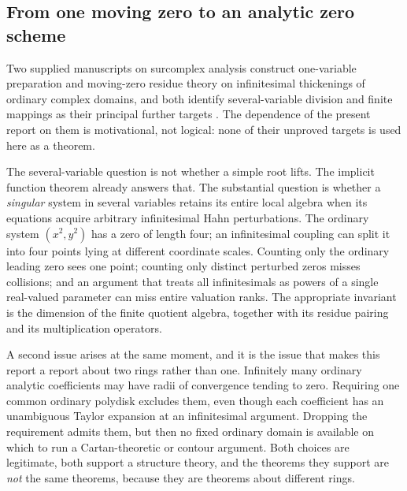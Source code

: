 \documentclass[11pt,letterpaper]{article}
\theoremstyle{definition}
\theoremstyle{remark}
\numberwithin{equation}{section}
\begin{document}
\subsection{From one moving zero to an analytic zero scheme}
\label{analytic:subsec:question}
Two supplied manuscripts on surcomplex analysis construct one-variable
preparation and moving-zero residue theory on infinitesimal thickenings of
ordinary complex domains, and both identify several-variable division and
finite mappings as their principal further targets
\cite{CompanionA,CompanionB}. The dependence of the present report on them is
motivational, not logical: none of their unproved targets is used here as a
theorem.

The several-variable question is not whether a simple root lifts. The
implicit function theorem already answers that. The substantial question is
whether a \emph{singular} system in several variables retains its entire
local algebra when its equations acquire arbitrary infinitesimal Hahn
perturbations. The ordinary system $(x^2,y^2)$ has a zero of length four; an
infinitesimal coupling can split it into four points lying at different
coordinate scales. Counting only the ordinary leading zero sees one point;
counting only distinct perturbed zeros misses collisions; and an argument
that treats all infinitesimals as powers of a single real-valued parameter
can miss entire valuation ranks. The appropriate invariant is the dimension
of the finite quotient algebra, together with its residue pairing and its
multiplication operators.

A second issue arises at the same moment, and it is the issue that makes
this report a report about two rings rather than one. Infinitely many
ordinary analytic coefficients may have radii of convergence tending to
zero. Requiring one common ordinary polydisk excludes them, even though
each coefficient has an unambiguous Taylor expansion at an infinitesimal
argument. Dropping the requirement admits them, but then no fixed ordinary
domain is available on which to run a Cartan-theoretic or contour argument.
Both choices are legitimate, both support a structure theory, and the
theorems they support are \emph{not} the same theorems, because they are
theorems about different rings.
\end{document}
